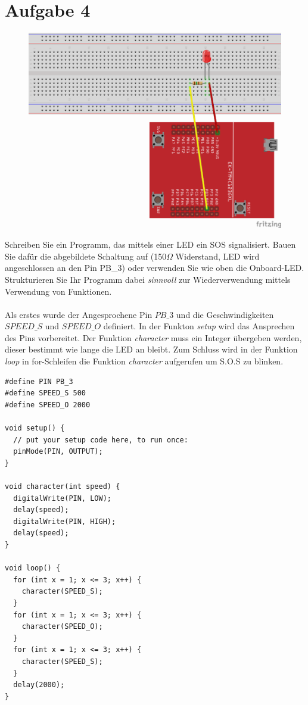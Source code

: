 \section{Aufgabe 4}
\begin{figure}[h]
	\centering
	\includegraphics[width=0.7\linewidth]{images/sosSchaltung}
\end{figure}
\noindent Schreiben Sie ein Programm, das mittels einer LED ein SOS signalisiert. Bauen Sie dafür die abgebildete Schaltung auf (150$\Omega$ Widerstand, LED wird angeschlossen an den Pin PB\_3) oder verwenden Sie wie oben die Onboard-LED. Strukturieren Sie Ihr Programm dabei \textit{sinnvoll} zur Wiederverwendung mittels Verwendung von Funktionen.\\ \\
Als erstes wurde der Angesprochene Pin $PB\_3$ und die Geschwindigkeiten $SPEED\_S$ und $SPEED\_O$ definiert. In der Funkton \textit{setup} wird das Ansprechen des Pins vorbereitet. Der Funktion \textit{character} muss ein Integer übergeben werden, dieser bestimmt wie lange die LED an bleibt. Zum Schluss wird in der Funktion \textit{loop} in for-Schleifen die Funktion \textit{character} aufgerufen um S.O.S zu blinken.
\begin{lstlisting}[label=lst:bash]
#define PIN PB_3
#define SPEED_S 500
#define SPEED_O 2000

void setup() {
  // put your setup code here, to run once:
  pinMode(PIN, OUTPUT); 
}

void character(int speed) {
  digitalWrite(PIN, LOW);
  delay(speed);
  digitalWrite(PIN, HIGH);
  delay(speed);
}

void loop() {
  for (int x = 1; x <= 3; x++) {
    character(SPEED_S);
  }
  for (int x = 1; x <= 3; x++) {
    character(SPEED_O);
  }
  for (int x = 1; x <= 3; x++) {
    character(SPEED_S);
  }
  delay(2000);
}
\end{lstlisting}
